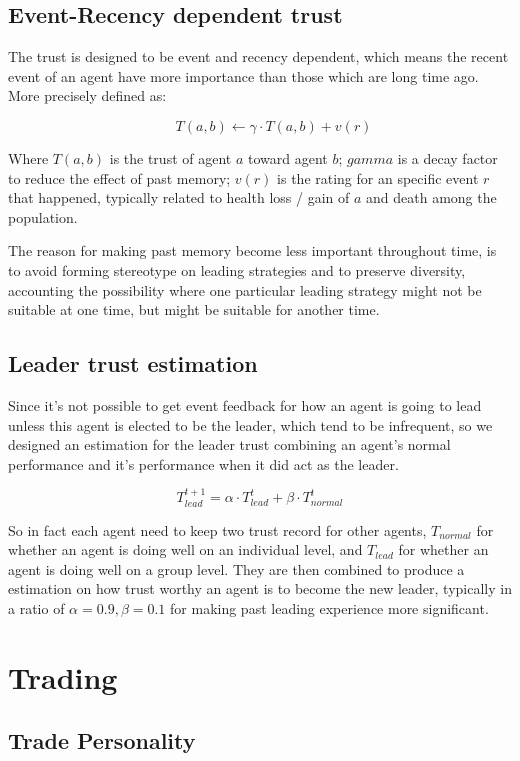 \subsection{Event-Recency dependent trust}
The trust is designed to be event and recency dependent, which means the recent event of an agent have more importance than those which are long time ago. More precisely defined as:

$$
    \qquad T(a,b) \leftarrow \gamma \cdot T(a,b) + v(r)
$$

Where $T(a,b)$ is the trust of agent $a$ toward agent $b$; $gamma$ is a decay factor to reduce the effect of past memory; $v(r)$ is the rating for an specific event $r$ that happened, typically related to health loss / gain of $a$ and death among the population.

The reason for making past memory become less important throughout time, is to avoid forming stereotype on leading strategies and to preserve diversity, accounting the possibility where one particular leading strategy might not be suitable at one time, but might be suitable for another time.

\subsection{Leader trust estimation}
Since it's not possible to get event feedback for how an agent is going to lead unless this agent is elected to be the leader, which tend to be infrequent, so we designed an estimation for the leader trust combining an agent's normal performance and it's performance when it did act as the leader.

$$
    T_{lead}^{t+1} = \alpha \cdot T_{lead}^t + \beta \cdot T_{normal}^t
$$

So in fact each agent need to keep two trust record for other agents, $T_{normal}$ for whether an agent is doing well on an individual level, and $T_{lead}$ for whether an agent is doing well on a group level. They are then combined to produce a estimation on how trust worthy an agent is to become the new leader, typically in a ratio of $\alpha=0.9, \beta=0.1$ for making past leading experience more significant.

\section{Trading}
\subsection{Trade Personality}

